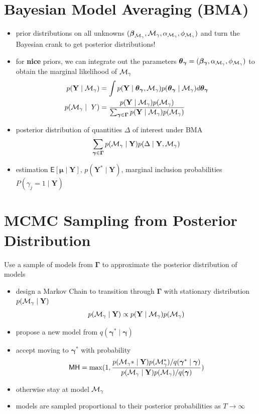 \documentclass[
]{report}
\newcommand{\E}{\textsf{E}}
\newcommand{\1}{\mathbf{1}_n}
\newcommand{\Y}{\mathbf{Y}}
\def\b{\boldsymbol{\beta}}
\def\bg{\boldsymbol{\beta_\gamma}}
\def\mub{\boldsymbol{\mu}}
\def\Mg{{\boldsymbol{{\cal M}_\gamma}}}
\def\tg{\boldsymbol{\theta}_{\boldsymbol{\gamma}}}
\def\g{\boldsymbol{\gamma}}
\def\G{\boldsymbol{\Gamma}}
\def\Mg{{\cal M}_\gamma}
\begin{document}
\section{Bayesian Model Averaging
(BMA)}\label{bayesian-model-averaging-bma}

\begin{itemize}
\item
  prior distributions on all unknowns
  \((\b_{\Mg}, \Mg, \alpha_{\Mg}, \phi_{\Mg})\) and turn the Bayesian
  crank to get posterior distributions!
\item
  for \textbf{nice} priors, we can integrate out the parameters
  \(\tg = (\bg, \alpha_{\Mg}, \phi_{\Mg})\) to obtain the marginal
  likelihood of \(\Mg\) \begin{align*}
  p(\Y \mid \Mg)  & = \int p(\Y \mid \tg, \Mg)p(\tg  \mid \Mg) d\tg \\
  p(\Mg \mid\ Y)  & = \frac {p(\Y \mid \Mg) p(\Mg)} {\sum_{\g \in \G} p(\Y \mid \Mg)p(\Mg)}
  \end{align*}
\item
  posterior distribution of quantities \(\Delta\) of interest under BMA
  \[
  \sum_{\g \in \G} p(\Mg \mid \Y) p(\Delta \mid \Y, \Mg) 
  \]
\item
  estimation \(\E[\mub \mid \Y]\), \(p(\Y^* \mid \Y)\), marginal
  inclusion probabilities \(P(\gamma_j = 1 \mid \Y)\)
\end{itemize}

\section{MCMC Sampling from Posterior
Distribution}\label{mcmc-sampling-from-posterior-distribution}

Use a sample of models from \(\G\) to approximate the posterior
distribution of models

\begin{itemize}
\item
  design a Markov Chain to transition through \(\G\) with stationary
  distribution \(p(\Mg \mid \Y)\) \[
    p(\Mg \mid \Y ) \propto p(\Y \mid \Mg) p(\Mg)
    \]
\item
  propose a new model from \(q(\g^* \mid \g)\)
\item
  accept moving to \(\g^*\) with probability \[
  \textsf{MH} = \max(1, \frac{p(\Mg* \mid \Y)p(\Mg^*)/q(\g^* \mid \g)}
                  {p(\Mg \mid \Y)p(\Mg)/q(\g)})
  \]
\item
  otherwise stay at model \(\Mg\)
\item
  models are sampled proportional to their posterior probabilities as
  \(T \to \infty\)
\end{itemize}
\end{document}
